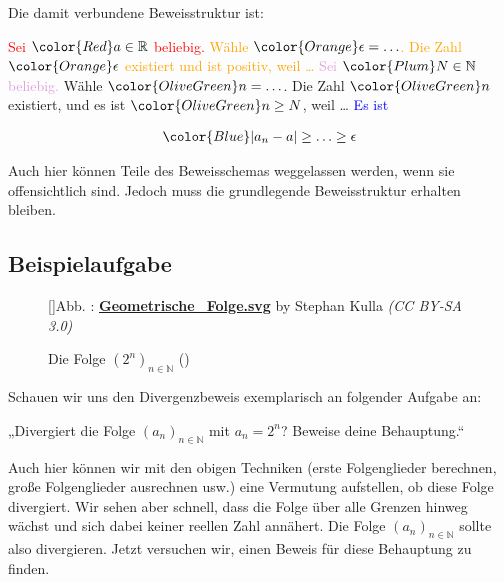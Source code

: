 \documentclass[fontsize=9pt,
               parskip=half-,
               DIV=14,
               listof=chapterentry,
               tocflat]{scrbook}
\newcounter{imagelabel}
\begin{document}
Die damit verbundene Beweisstruktur ist:

\begin{importantparagraph*}
{\textcolor{Red}{Sei ${\color {Red}a\in \mathbb {R} }$ beliebig.}} {\textcolor{Orange}{Wähle ${\color {Orange}\epsilon =\ldots }$. Die Zahl ${\color {Orange}\epsilon }$ existiert und ist positiv, weil …}} {\textcolor{Plum}{Sei ${\color {Plum}N\in \mathbb {N} }$ beliebig.}} {\textcolor{OliveGreen}{Wähle ${\color {OliveGreen}n=\ldots }$. Die Zahl ${\color {OliveGreen}n}$ existiert, und es ist ${\color {OliveGreen}n\geq N}$, weil …}} {\textcolor{Blue}{Es ist}}

\begin{align*}
{\color {Blue}|a_{n}-a|\geq \ldots \geq \epsilon }
\end{align*}

\end{importantparagraph*}

Auch hier können Teile des Beweisschemas weggelassen werden, wenn sie offensichtlich sind. Jedoch muss die grundlegende Beweisstruktur erhalten bleiben.

\subsection{Beispielaufgabe}

\begin{figure}[h]
\vspace{\baselineskip}
[]{Abb. : \protect\href{https://commons.wikimedia.org/wiki/File:Geometrische_Folge.svg}{\textbf{Geometrische\allowbreak\_Folge.svg}} by Stephan Kulla \textit{(CC BY-SA 3.0)}}\centering
{}
\caption*{Die Folge $(2^{n})_{n\in \mathbb {N} }$ ()}
\end{figure}
Schauen wir uns den Divergenzbeweis exemplarisch an folgender Aufgabe an:

\begin{importantparagraph*}
„Divergiert die Folge $(a_{n})_{n\in \mathbb {N} }$ mit $a_{n}=2^{n}$? Beweise deine Behauptung.“

\end{importantparagraph*}

Auch hier können wir mit den obigen Techniken (erste Folgenglieder berechnen, große Folgenglieder ausrechnen usw.) eine Vermutung aufstellen, ob diese Folge divergiert. Wir sehen aber schnell, dass die Folge über alle Grenzen hinweg wächst und sich dabei keiner reellen Zahl annähert. Die Folge $(a_{n})_{n\in \mathbb {N} }$ sollte also divergieren. Jetzt versuchen wir, einen Beweis für diese Behauptung zu finden.
\end{document}

